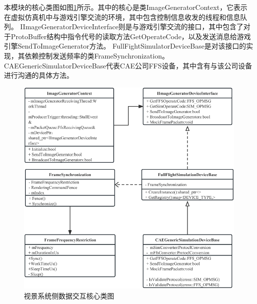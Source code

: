 本模块的核心类图如图\ref{module32}所示。其中的核心是类ImageGeneratorContext，它表示在虚拟仿真机中与游戏引擎交流的环境，其中包含控制信息收发的线程和信息队列。
IImageGeneratorDeviceInterface则是与游戏引擎交流的接口，其中包含了对于ProtoBuffer结构中指令代号的读取方法GetOperateCode，以及发送消息给游戏引擎SendToImageGenerator方法。
FullFightSimulatorDeviceBase是对该接口的实现，其依赖控制发送频率的类FrameSynchronization。CAEGenericSimulatorDeviceBase代表CAE公司FFS设备，其中含有与该公司设备进行沟通的具体方法。
\begin{figure}[h!]
    \begin{center}
        \includegraphics[width=\textwidth]{pictures/classdiagram3.pdf}
        \caption{视景系统侧数据交互核心类图}
        \label{module32}
    \end{center}
\end{figure}
